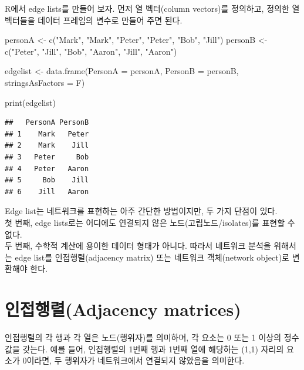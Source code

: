 \documentclass[
]{book}
\newenvironment{Shaded}{\begin{snugshade}}{\end{snugshade}}
\newcommand{\AttributeTok}[1]{\textcolor[rgb]{0.77,0.63,0.00}{#1}}
\newcommand{\FunctionTok}[1]{\textcolor[rgb]{0.00,0.00,0.00}{#1}}
\newcommand{\NormalTok}[1]{#1}
\newcommand{\OtherTok}[1]{\textcolor[rgb]{0.56,0.35,0.01}{#1}}
\newcommand{\StringTok}[1]{\textcolor[rgb]{0.31,0.60,0.02}{#1}}
\begin{document}
R에서 edge lists를 만들어 보자. 먼저 열 벡터(column vectors)를 정의하고, 정의한 열 벡터들을 데이터 프레임의 변수로 만들어 주면 된다.

\begin{Shaded}
\begin{Highlighting}[]
\NormalTok{personA }\OtherTok{\textless{}{-}} \FunctionTok{c}\NormalTok{(}\StringTok{"Mark"}\NormalTok{, }\StringTok{"Mark"}\NormalTok{, }\StringTok{"Peter"}\NormalTok{, }\StringTok{"Peter"}\NormalTok{, }\StringTok{"Bob"}\NormalTok{, }\StringTok{"Jill"}\NormalTok{)}
\NormalTok{personB }\OtherTok{\textless{}{-}} \FunctionTok{c}\NormalTok{(}\StringTok{"Peter"}\NormalTok{, }\StringTok{"Jill"}\NormalTok{, }\StringTok{"Bob"}\NormalTok{, }\StringTok{"Aaron"}\NormalTok{, }\StringTok{"Jill"}\NormalTok{, }\StringTok{"Aaron"}\NormalTok{)}

\NormalTok{edgelist }\OtherTok{\textless{}{-}} \FunctionTok{data.frame}\NormalTok{(}\AttributeTok{PersonA =}\NormalTok{ personA, }\AttributeTok{PersonB =}\NormalTok{ personB, }\AttributeTok{stringsAsFactors =}\NormalTok{ F)}

\FunctionTok{print}\NormalTok{(edgelist)}
\end{Highlighting}
\end{Shaded}

\begin{verbatim}
##   PersonA PersonB
## 1    Mark   Peter
## 2    Mark    Jill
## 3   Peter     Bob
## 4   Peter   Aaron
## 5     Bob    Jill
## 6    Jill   Aaron
\end{verbatim}

Edge list는 네트워크를 표현하는 아주 간단한 방법이지만, 두 가지 단점이 있다.\\
첫 번째, edge lists로는 어디에도 연결되지 않은 노드(고립노드/isolates)를 표현할 수 없다.\\
두 번째, 수학적 계산에 용이한 데이터 형태가 아니다. 따라서 네트워크 분석을 위해서는 edge list를 인접행렬(adjacency matrix) 또는 네트워크 객체(network object)로 변환해야 한다.

\hypertarget{uxc778uxc811uxd589uxb82cadjacency-matrices}{%
\section{인접행렬(Adjacency matrices)}\label{uxc778uxc811uxd589uxb82cadjacency-matrices}}

인접행렬의 각 행과 각 열은 노드(행위자)를 의미하며, 각 요소는 0 또는 1 이상의 정수 값을 갖는다. 예를 들어, 인접행렬의 1번째 행과 1번째 열에 해당하는 (1,1) 자리의 요소가 0이라면, 두 행위자가 네트워크에서 연결되지 않았음을 의미한다.
\end{document}
